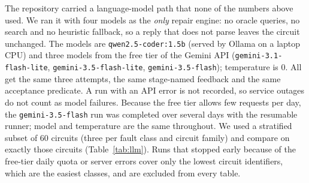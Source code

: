 \documentclass[journal]{IEEEtran}
\begin{document}
The repository carried a language-model path that none of the numbers above used. We ran it
with four models as the \emph{only} repair engine: no oracle queries, no search and no
heuristic fallback, so a reply that does not parse leaves the circuit unchanged. The models are
\texttt{qwen2.5-coder:1.5b} (served by Ollama on a laptop CPU) and three models from the free tier
of the Gemini API (\texttt{gemini-3.1-flash-lite}, \texttt{gemini-3.5-flash-lite}, \texttt{gemini-3.5-flash}); temperature
is $0$. All get the same three attempts, the same stage-named feedback and the same acceptance
predicate. A run with an API error is not recorded, so service outages do not count as model
failures. Because the free tier allows few requests per day, the \texttt{gemini-3.5-flash} run was completed over several days with the resumable runner; model and temperature are the same throughout. We used a stratified subset of 60 circuits (three per fault class and circuit family)
and compare on exactly those circuits (Table~\ref{tab:llm}). Runs that stopped early because
of the free-tier daily quota or server errors cover only the lowest circuit identifiers, which
are the easiest classes, and are excluded from every table.


\end{document}
